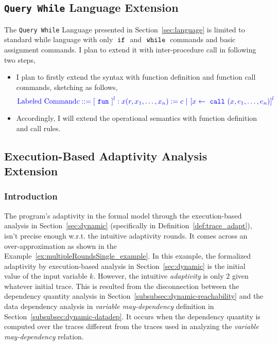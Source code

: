 \subsection{{\tt Query While} Language Extension}
\label{subsec:furthers-language}
The {\tt Query While} Language presented in Section~\ref*{sec:language} is limited to 
standard while language with only $\;\mathtt{if}\;$ and $\;\mathtt{while}\;$ commands and basic assignment commands.
I plan to extend it with inter-procedure call in following two steps,
\begin{itemize}
    \item I plan to firstly extend the syntax with  function definition and function call commands, sketching as follows,
\[
\highlight
{\mbox{Labeled Command} 
c ::= 
\clabel{\efun}^l: x(r, x_1, \ldots, x_n) := c
~|~ \clabel{\assign{x}{\ecall(x, e_1, \ldots, e_n)}}^l
}
\]
    \item Accordingly, I will extend the operational semantics with function definition and call rules.
\end{itemize}

\subsection{Execution-Based Adaptivity Analysis Extension}
\label{subsec:furthers-dep-depth}
%
\subsubsection{Introduction}
\label{sec:furthers-exe-intro}
The program's adaptivity in the formal model through the execution-based analysis in Section~\ref{sec:dynamic}
(specifically in Definition~\ref{def:trace_adapt}), isn't precise enough w.r.t. the intuitive adaptivity rounds.
It comes across an over-approximation 
as shown in the Example~\ref{ex:multipleRoundsSingle_example}.
In this example, the formalized adaptivity by execution-based analysis in Section~\ref{sec:dynamic} 
is the initial value of the input variable $k$.
However, the intuitive \emph{adaptivity} is only $2$ given whatever initial trace.
This is resulted from the
disconnection between the 
dependency quantity analysis in Section~\ref{subsubsec:dynamic-reachability} and 
the data dependency analysis in \emph{variable may-dependency} definition in Section~\ref{subsubsec:dynamic-datadep}.
It occurs when the 
dependency quantity is computed over the traces different from the traces used in 
analyzing the \emph{variable may-dependency} relation.

